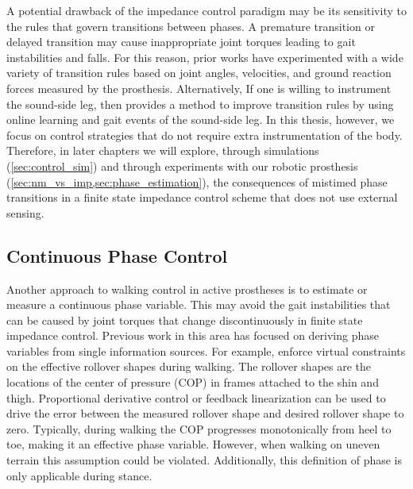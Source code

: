 A potential drawback of the impedance control paradigm may be its sensitivity to
the rules that govern transitions between phases. A premature transition or
delayed transition may cause inappropriate joint torques leading to gait
instabilities and falls. For this reason, prior works have experimented with a
wide variety of transition rules based on joint angles, velocities, and ground
reaction forces measured by the prosthesis. Alternatively, If one is willing to
instrument the sound-side leg, then \citet{liu2014improving} provides a method
to improve transition rules by using online learning and gait events of the
sound-side leg. In this thesis, however, we focus on control strategies that do
not require extra instrumentation of the body. Therefore, in later chapters we
will explore, through simulations (\cref{sec:control_sim}) and through
experiments with our robotic prosthesis
(\cref{sec:nm_vs_imp,sec:phase_estimation}), the consequences of mistimed phase
transitions in a finite state impedance control scheme that does not use
external sensing.

\subsection{Continuous Phase Control}\label{sec:back_walk_cont_phase}
Another approach to walking control in active prostheses is to estimate or
measure a continuous phase variable. This may avoid the gait instabilities that
can be caused by joint torques that change discontinuously in finite state
impedance control. Previous work in this area has focused on deriving phase
variables from single information sources. For example, \citet{gregg2014virtual}
enforce virtual constraints on the effective rollover shapes during walking.
The rollover shapes are the locations of the center of pressure (COP) in frames
attached to the shin and thigh. Proportional derivative control or feedback
linearization can be used to drive the error between the measured rollover shape
and desired rollover shape to zero. Typically, during walking the COP progresses
monotonically from heel to toe, making it an effective phase variable. However,
when walking on uneven terrain this assumption could be violated. Additionally,
this definition of phase is only applicable during stance.

